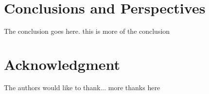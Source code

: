 \documentclass[10pt, conference, compsocconf]{IEEEtran}
\begin{document}
\section{Conclusions and Perspectives}
\label{sec:ccl}

The conclusion goes here. this is more of the conclusion

\section*{Acknowledgment}


The authors would like to thank...
more thanks here



\end{document}
